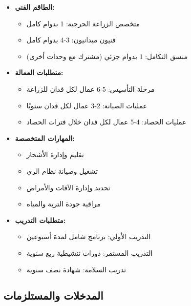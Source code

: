 \begin{itemize}
    \item \textbf{الطاقم الفني:}
    \begin{itemize}
        \item متخصص الزراعة الحرجية: 1 بدوام كامل
        \item فنيون ميدانيون: 3-4 بدوام كامل
        \item منسق التكامل: 1 بدوام جزئي (مشترك مع وحدات أخرى)
    \end{itemize}
    \item \textbf{متطلبات العمالة:}
    \begin{itemize}
        \item مرحلة التأسيس: 5-6 عمال لكل فدان للزراعة
        \item عمليات الصيانة: 2-3 عمال لكل فدان سنويًا
        \item عمليات الحصاد: 4-5 عمال لكل فدان خلال فترات الحصاد
    \end{itemize}
    \item \textbf{المهارات المتخصصة:}
    \begin{itemize}
        \item تقليم وإدارة الأشجار
        \item تشغيل وصيانة نظام الري
        \item تحديد وإدارة الآفات والأمراض
        \item مراقبة جودة التربة والمياه
    \end{itemize}
    \item \textbf{متطلبات التدريب:}
    \begin{itemize}
        \item التدريب الأولي: برنامج شامل لمدة أسبوعين
        \item التدريب المستمر: دورات تنشيطية ربع سنوية
        \item تدريب السلامة: شهادة نصف سنوية
    \end{itemize}
\end{itemize}

\subsection{المدخلات والمستلزمات}

